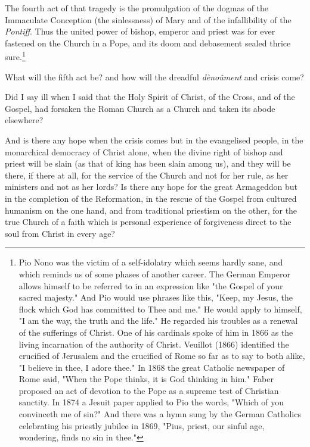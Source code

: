 \documentclass[12pt,a5paper,twoside]{book}
\begin{document}
The fourth act of that tragedy is the promulgation 
of the dogmas of the Immaculate Conception (the 
sinlessness) of Mary and of the infallibility of the 
\textit{Pontiff}. Thus the united power of bishop, emperor 
and priest was for ever fastened on the Church in a 
Pope, and its doom and debasement sealed thrice sure.\footnote{
Pio Nono was the victim of a self-idolatry which seems hardly 
sane, and which reminds us of some phases of another career. The 
German Emperor allows himself to be referred to in an expression 
like "the Gospel of your sacred majesty." And Pio would use 
phrases like this, "Keep, my Jesus, the flock which God has 
committed to Thee and me." He would apply to himself, "I am 
the way, the truth and the life." He regarded his troubles as a 
renewal of the sufferings of Christ. One of his cardinals spoke of 
him in 1866 as the living incarnation of the authority of Christ. 
Veuillot (1866) identified the crucified of Jerusalem and the crucified 
of Rome so far as to say to both alike, "I believe in thee, I adore 
thee." In 1868 the great Catholic newspaper of Rome said, 
"When the Pope thinks, it is God thinking in him." Faber proposed 
an act of devotion to the Pope as a supreme test of Christian 
sanctity. In 1874 a Jesuit paper applied to Pio the words, "Which 
of you convinceth me of sin?" And there was a hymn sung by the 
German Catholics celebrating his priestly jubilee in 1869, "Pius, 
priest, our sinful age, wondering, finds no sin in thee."
}

What will the fifth act be? and how will the 
dreadful \textit{d\`{e}no\^{u}ment} and crisis come? 

Did I say ill when I said that the Holy Spirit of 
Christ, of the Cross, and of the Gospel, had forsaken 
the Roman Church as a Church and taken its abode 
elsewhere? 

And is there any hope when the crisis comes but 
in the evangelised people, in the monarchical democracy 
of Christ alone, when the divine right of 
bishop and priest will be slain (as that of king has 
been slain among us), and they will be there, if there at 
all, for the service of the Church and not for her rule, 
as her ministers and not as her lords? Is there any 
hope for the great Armageddon but in the completion 
of the Reformation, in the rescue of the Gospel from 
cultured humanism on the one hand, and from traditional 
priestism on the other, for the true Church of 
a faith which is personal experience of forgiveness 
direct to the soul from Christ in every age? 
\end{document}
